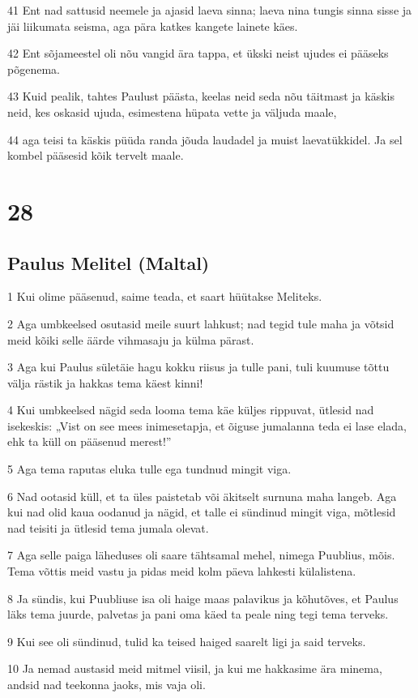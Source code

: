 \par 41 Ent nad sattusid neemele ja ajasid laeva sinna; laeva nina tungis sinna sisse ja jäi liikumata seisma, aga pära katkes kangete lainete käes.
\par 42 Ent sõjameestel oli nõu vangid ära tappa, et ükski neist ujudes ei pääseks põgenema.
\par 43 Kuid pealik, tahtes Paulust päästa, keelas neid seda nõu täitmast ja käskis neid, kes oskasid ujuda, esimestena hüpata vette ja väljuda maale,
\par 44 aga teisi ta käskis püüda randa jõuda laudadel ja muist laevatükkidel. Ja sel kombel pääsesid kõik tervelt maale.

\chapter{28}

\section*{Paulus Melitel (Maltal)}

\par 1 Kui olime pääsenud, saime teada, et saart hüütakse Meliteks.
\par 2 Aga umbkeelsed osutasid meile suurt lahkust; nad tegid tule maha ja võtsid meid kõiki selle äärde vihmasaju ja külma pärast.
\par 3 Aga kui Paulus sületäie hagu kokku riisus ja tulle pani, tuli kuumuse tõttu välja rästik ja hakkas tema käest kinni!
\par 4 Kui umbkeelsed nägid seda looma tema käe küljes rippuvat, ütlesid nad isekeskis: „Vist on see mees inimesetapja, et õiguse jumalanna teda ei lase elada, ehk ta küll on pääsenud merest!”
\par 5 Aga tema raputas eluka tulle ega tundnud mingit viga.
\par 6 Nad ootasid küll, et ta üles paistetab või äkitselt surnuna maha langeb. Aga kui nad olid kaua oodanud ja nägid, et talle ei sündinud mingit viga, mõtlesid nad teisiti ja ütlesid tema jumala olevat.
\par 7 Aga selle paiga läheduses oli saare tähtsamal mehel, nimega Puublius, mõis. Tema võttis meid vastu ja pidas meid kolm päeva lahkesti külalistena.
\par 8 Ja sündis, kui Puubliuse isa oli haige maas palavikus ja kõhutõves, et Paulus läks tema juurde, palvetas ja pani oma käed ta peale ning tegi tema terveks.
\par 9 Kui see oli sündinud, tulid ka teised haiged saarelt ligi ja said terveks.
\par 10 Ja nemad austasid meid mitmel viisil, ja kui me hakkasime ära minema, andsid nad teekonna jaoks, mis vaja oli.

